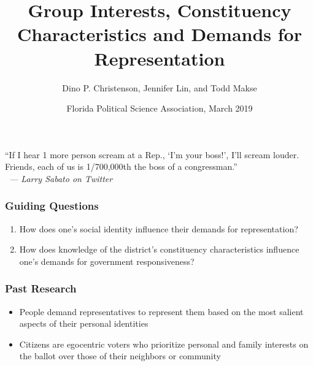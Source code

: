 \documentclass[14pt]{beamer}
\newcommand\e{\emph}
\begin{document}
\author[D. Christenson, J. Lin, and T. Makse] %
{Dino P. Christenson, Jennifer Lin, and Todd Makse}
\title[Demands for Representation]{Group Interests, Constituency Characteristics and Demands for Representation}
	\date[FPSA 2019]{Florida Political Science Association, March 2019}
	\begin{frame}[plain]
	\maketitle
\end{frame}

\begin{frame}
\frametitle{}
\begin{center}
	“If I hear 1 more person scream at a Rep., ‘I’m your boss!’, I’ll scream louder.
	Friends, each of us is 1/700,000th the boss of a congressman.”
\\\
	{\e {--- Larry Sabato on Twitter}}
\end{center}
\end{frame}

\begin{frame}
\frametitle{Guiding Questions}
\begin{enumerate}
	\item How does one's social identity influence their demands for representation?
	\item How does knowledge of the district's constituency characteristics influence one's demands for government responsiveness? 
\end{enumerate}
\end{frame}

\begin{frame}
\frametitle{Past Research}
\begin{itemize}
	\item People demand representatives to represent them based on the most salient aspects of their personal identities
	\item Citizens are egocentric voters who prioritize personal and family interests on the ballot over those of their neighbors or community
\end{itemize}
\end{frame}
\end{document}
